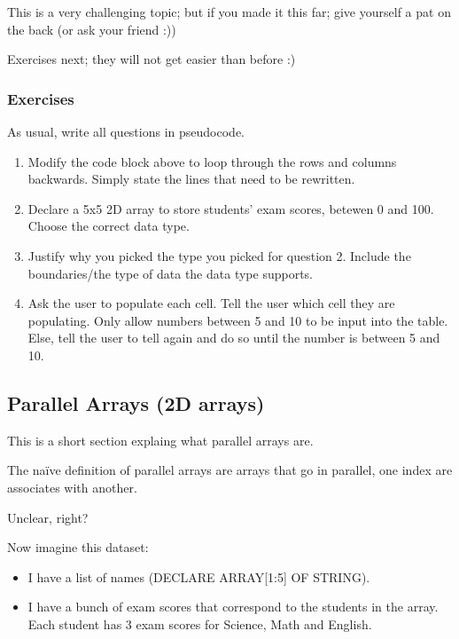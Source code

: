 \documentclass[./main.tex]{subfiles}
\begin{document}
This is a very challenging topic; but if you made it this far; give yourself a pat on the back (or ask your friend :))

Exercises next; they will not get easier than before :)

\newpage
\subsubsection{Exercises}
\label{ex:3_3_3}

As usual, write all questions in pseudocode.

\begin{enumerate}
    \item Modify the code block above to loop through the rows and columns backwards. Simply state the lines that need to be rewritten.
        \smalllines
    \item Declare a 5x5 2D array to store students' exam scores, betewen 0 and 100. Choose the correct data type.
        \smalllines
    \item Justify why you picked the type you picked for question 2. Include the boundaries/the type of data the data type supports.
        \mediumlines
    \item Ask the user to populate each cell. Tell the user which cell they are populating. Only allow numbers between 5 and 10 to be input into the table. Else, tell the user to tell again and do so until the number is between 5 and 10.
        \verylargelines
\end{enumerate}

\newpage
\subsection{Parallel Arrays (2D arrays)}

This is a short section explaing what parallel arrays are.

The naïve definition of parallel arrays are arrays that go in parallel, one index are associates with another.

Unclear, right?

Now imagine this dataset:

\begin{itemize}
    \item I have a list of names ({\ccmono DECLARE ARRAY[1:5] OF STRING}).
    \item I have a bunch of exam scores that correspond to the students in the array. Each student has 3 exam scores for Science, Math and English.
\end{itemize}
\end{document}

